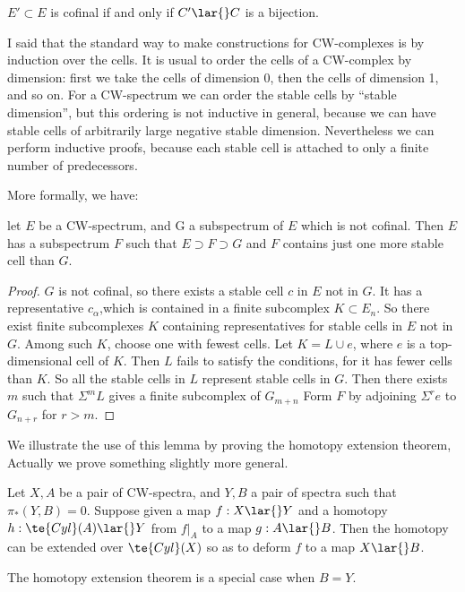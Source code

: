 \documentclass[../main]{subfiles}
\begin{document}
\begin{examples}
$E'\subset E$ is cofinal if and only if $C'\lar{} C$ is a bijection.

I said that the standard way to make constructions for CW-complexes is by induction over the cells. It is usual to order the cells of a
CW-complex by dimension: first we take the cells of dimension 0, then
the cells of dimension 1, and so on. For a CW-spectrum we can order
the stable cells by ``stable dimension'', but this ordering is not inductive
 in general, because we can have stable cells of arbitrarily large negative
stable dimension. Nevertheless we can perform inductive proofs, because each stable cell is attached to only a finite number of predecessors.
\end{examples}More formally, we have:
\begin{lemma}\label{lem:p3ch03.1}
let $E$ be a CW-spectrum, and G a subspectrum
of $E$ which is not cofinal. Then $E$ has a subspectrum $F$ such that
$E\supset F\supset G$ and $F$ contains just one more stable cell than $G$. 
\end{lemma}
\begin{proof}
$G$ is not cofinal, so there exists a stable cell $c$ in $E$
not in $G$. It has a representative $c_\alpha$,which is contained in a finite subcomplex $K\subset E_n$. So there exist finite subcomplexes $K$ containing representatives for stable cells in $E$ not in $G$. Among such $K$, choose
one with fewest cells. Let $K=L\cup e$, where $e$ is a top-dimensional
cell of $K$. Then $L$ fails to satisfy the conditions, for it has fewer cells
than $K$. So all the stable cells in $L$ represent stable cells in $G$. Then
there exists $m$ such that $\Sigma^mL$ gives a finite subcomplex of $G_{m+n}$
Form $F$ by adjoining $\Sigma^re$ to $G_{n+r}$ for $r>m$.
\end{proof}
We illustrate the use of this lemma by proving the homotopy extension theorem, Actually we prove something slightly more general. 
\begin{lemma}\label{lem:p3ch03.2}
Let $X,A$ be a pair of CW-spectra, and $Y,B$ a
pair of spectra such that $\pi_\ast(Y,B)= 0$. Suppose given a map $f:X\lar{}Y$
and a homotopy $h: \te{Cyl}(A)\lar{} Y$ from $f|_A$ to a map $g:A\lar{}B$. Then the homotopy can be extended over $\te{Cyl}(X)$ so as to deform $f$ to a map $X\lar{}B$.
\end{lemma}
The homotopy extension theorem is a special case when $B=Y$.
\end{document}
